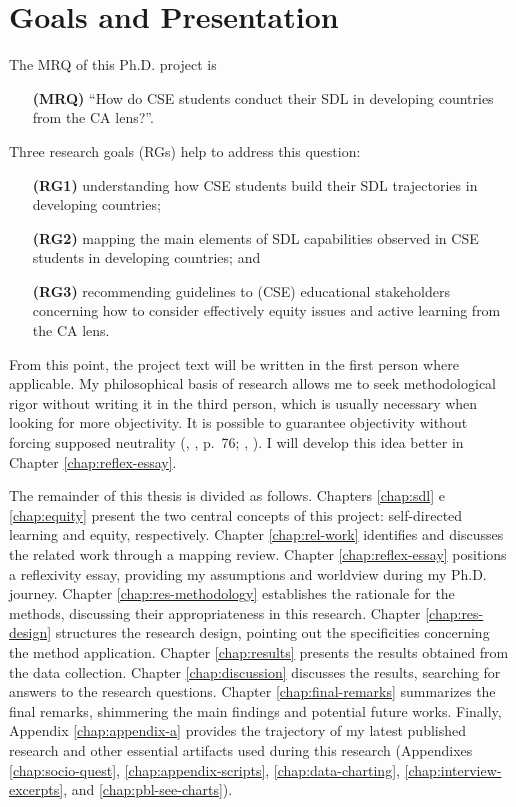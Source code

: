 \section{Goals and Presentation}
\label{intro-sec:goals-pres}

The \gls{MRQ} of this \gls{Ph.D.} project is 
\begin{itemize}
    \item[\textbf{(\gls{MRQ})}] ``How do \gls{CSE} students conduct their \gls{SDL} in developing countries from the \gls{CA} lens?''.
\end{itemize}
Three research goals (\glspl{RG}) help to address this question: 
\begin{itemize}
    \item[\textbf{(\gls{RG}1)}] understanding how \gls{CSE} students build their \gls{SDL} trajectories in developing countries; 
    \item[\textbf{(\gls{RG}2)}] mapping the main elements of \gls{SDL} capabilities observed in \gls{CSE} students in developing countries; and
    \item[\textbf{(\gls{RG}3)}] recommending guidelines to (\gls{CSE}) educational stakeholders concerning how to consider effectively equity issues and active learning from the \gls{CA} lens.
\end{itemize} 

From this point, the project text will be written in the first person where applicable. My philosophical basis of research allows me to seek methodological rigor without writing it in the third person, which is usually necessary when looking for more objectivity. It is possible to guarantee objectivity without forcing supposed neutrality (\citeauthor{saviani:1994}, \citeyear{saviani:1994}, p.~76; \citeauthor{bispojr:2022-educomp}, \citeyear{bispojr:2022-educomp}). I will develop this idea better in Chapter \ref{chap:reflex-essay}.

The remainder of this thesis is divided as follows. Chapters \ref{chap:sdl} e \ref{chap:equity} present the two central concepts of this project: self-directed learning and equity, respectively. Chapter \ref{chap:rel-work} identifies and discusses the related work through a mapping review. Chapter \ref{chap:reflex-essay} positions a reflexivity essay, providing my assumptions and worldview during my \gls{Ph.D.} journey. Chapter \ref{chap:res-methodology} establishes the rationale for the methods, discussing their appropriateness in this research. Chapter \ref{chap:res-design} structures the research design, pointing out the specificities concerning the method application. Chapter \ref{chap:results} presents the results obtained from the data collection. Chapter \ref{chap:discussion} discusses the results, searching for answers to the research questions. Chapter \ref{chap:final-remarks} summarizes the final remarks, shimmering the main findings and potential future works. Finally, Appendix \ref{chap:appendix-a} provides the trajectory of my latest published research and other essential artifacts used during this research (Appendixes \ref{chap:socio-quest}, \ref{chap:appendix-scripts}, \ref{chap:data-charting}, \ref{chap:interview-excerpts}, and \ref{chap:pbl-see-charts}).

